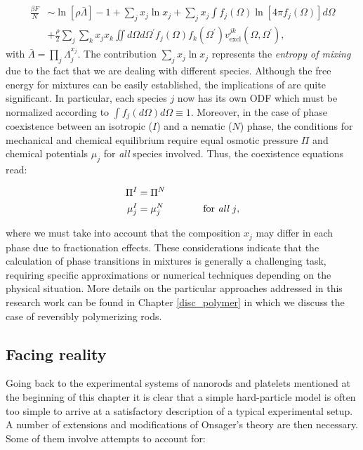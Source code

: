 \begin{align}
\frac{\beta F}{N} &\sim \ln [\rho \bar{\Lambda}]-1 + \sum_{j} x_{j} \ln x_{j} +
\sum_{j} x_{j} \int f_{j}(\Omega)\ln \left[ 4 \pi f_{j}(\Omega) \right] d \Omega \nonumber \\
&+\frac{\rho}{2}\sum_{j}\sum_{k}x_{j}x_{k} \iint  d \Omega d\Omega^{\prime}
f_{j}(\Omega)f_{k}(\Omega^{\prime})
v_{\text{excl}}^{jk}(\Omega,\Omega^{\prime}),  \label{0freetotmulti}
\end{align}
with $\bar{\Lambda}=\prod_{j}\Lambda_{j}^{x_{j}}$. The contribution $\sum_{j} x_{j} \ln x_{j}$ represents the {\em entropy of mixing} due to the fact that we are dealing with different species. Although the free energy for mixtures can be easily established,  the implications of  are quite significant. In particular, each species $j$ now has its own ODF which must be normalized according to $\int f_{j}(d\Omega)d\Omega \equiv 1$. Moreover, in the case of phase coexistence between an isotropic ($I$) and a nematic ($N$) phase, the conditions for mechanical and chemical equilibrium require equal osmotic pressure $\Pi$ and chemical potentials $\mu_{j}$ for {\em all} species involved. Thus, the coexistence equations read:

\begin{align}
\Pi^{I}&=\Pi^{N} \nonumber \\
\mu^{I}_{j}&=\mu^{N}_{j} \qquad\qquad \text{for {\em all} $j$},
\end{align}

where we must take into account that the composition ${x_{j}}$ may differ in each phase due to fractionation effects. These considerations indicate that the calculation of phase transitions in mixtures is generally a challenging task, requiring specific approximations or numerical techniques depending on the physical situation. More details on the particular approaches addressed in this research work can be found in Chapter \ref{disc_polymer} in which we discuss the case of reversibly polymerizing rods.

\subsection{Facing reality}

Going back to the experimental systems of nanorods and platelets mentioned at the beginning of this chapter it is clear that a simple hard-particle model is often too simple to arrive at a satisfactory description of a typical experimental setup. A number of extensions and modifications of Onsager's theory are then necessary. Some of them involve attempts to account for:

